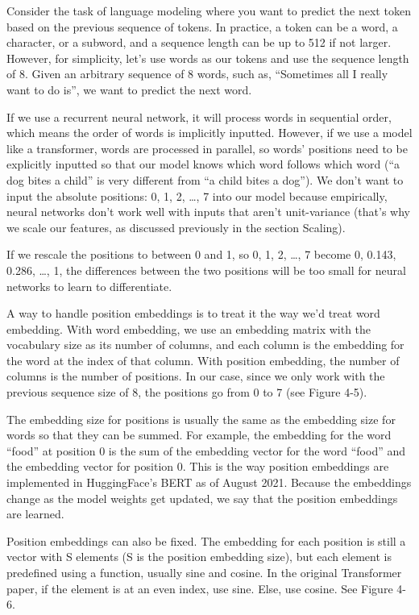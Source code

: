 \documentclass[openany]{book}
\begin{document}
Consider the task of language modeling where you want to predict the next token based on the previous sequence of tokens. In practice, a token can be a word, a character, or a subword, and a sequence length can be up to 512 if not larger. However, for simplicity, let’s use words as our tokens and use the sequence length of 8. Given an arbitrary sequence of 8 words, such as, “Sometimes all I really want to do is”, we want to predict the next word.

If we use a recurrent neural network, it will process words in sequential order, which means the order of words is implicitly inputted. However, if we use a model like a transformer, words are processed in parallel, so words’ positions need to be explicitly inputted so that our model knows which word follows which word (“a dog bites a child” is very different from “a child bites a dog”). We don’t want to input the absolute positions:  0, 1, 2, …, 7 into our model because empirically, neural networks don’t work well with inputs that aren’t unit-variance (that’s why we scale our features, as discussed previously in the section Scaling).

If we rescale the positions to between 0 and 1, so 0, 1, 2, …, 7 become 0, 0.143, 0.286, …, 1, the differences between the two positions will be too small for neural networks to learn to differentiate.

A way to handle position embeddings is to treat it the way we’d treat word embedding. With word embedding, we use an embedding matrix with the vocabulary size as its number of columns, and each column is the embedding for the word at the index of that column. With position embedding, the number of columns is the number of positions. In our case, since we only work with the previous sequence size of 8, the positions go from 0 to 7 (see Figure 4-5). 

The embedding size for positions is usually the same as the embedding size for words so that they can be summed. For example, the embedding for the word “food” at position 0 is the sum of the embedding vector for the word “food” and the embedding vector for position 0. This is the way position embeddings are implemented in HuggingFace’s BERT as of August 2021. Because the embeddings change as the model weights get updated, we say that the position embeddings are learned.

Position embeddings can also be fixed. The embedding for each position is still a vector with S elements (S is the position embedding size), but each element is predefined using a function, usually sine and cosine. In the original Transformer paper, if the element is at an even index, use sine. Else, use cosine. See Figure 4-6.
\end{document}
